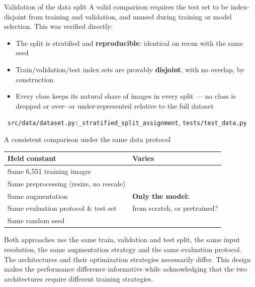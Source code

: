 \documentclass[aspectratio=169]{beamer}
\begin{document}
\begin{frame}{Validation of the data split}
\small
A valid comparison requires the test set to be index-disjoint from
training and validation, and unused during training or model selection.
This was verified directly:
\begin{itemize}
  \item The split is stratified and \textbf{reproducible}: identical on
    rerun with the same seed
  \item Train/validation/test index sets are provably \textbf{disjoint},
    with no overlap, by construction
  \item Every class keeps its natural share of images in every split — no
    class is dropped or over- or under-represented relative to the full
    dataset
\end{itemize}

\vspace{0.05em}
{\scriptsize\color{black!55}\textrightarrow\ \texttt{src/data/dataset.py:\_stratified\_split\_assignment}, \texttt{tests/test\_data.py}}
\end{frame}

\begin{frame}{A consistent comparison under the same data protocol}
\centering
\vspace{0.5em}
\begin{tabular}{ll}
\toprule
\textbf{Held constant} & \textbf{Varies} \\
\midrule
Same 6{,}551 training images & \\
Same preprocessing (resize, no rescale) & \\
Same augmentation & \textbf{Only the model:} \\
Same evaluation protocol \& test set & from scratch, or pretrained? \\
Same random seed & \\
\bottomrule
\end{tabular}

\vspace{1.5em}
\normalsize Both approaches use the same train, validation and test split,
the same input resolution, the same augmentation strategy and the same
evaluation protocol. The architectures and their optimization strategies
necessarily differ. This design makes the performance difference
informative while acknowledging that the two architectures require
different training strategies.
\end{frame}

\end{document}
